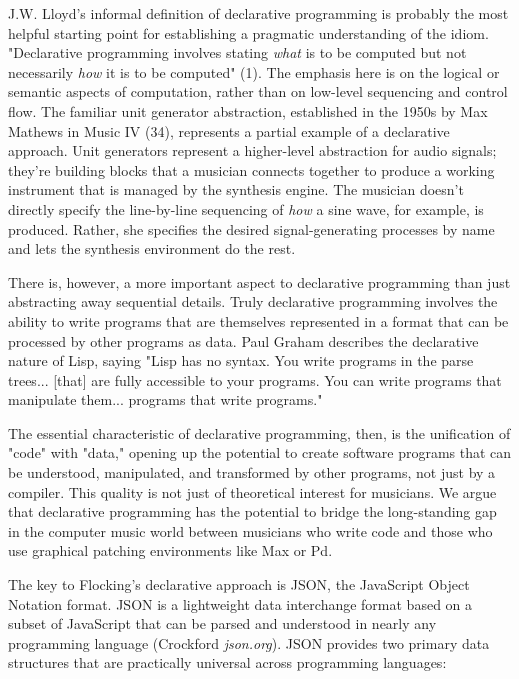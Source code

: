 \documentclass{article}
\begin{document}
J.W. Lloyd's informal definition of declarative programming is probably the most helpful starting point for establishing a pragmatic understanding of the idiom. "Declarative programming involves stating {\it what} is to be computed but not necessarily {\it how} it is to be computed" (1). The emphasis here is on the logical or semantic aspects of computation, rather than on low-level sequencing and control flow. The familiar unit generator abstraction, established in the 1950s by Max Mathews in Music IV (34), represents a partial example of a declarative approach. Unit generators represent a higher-level abstraction for audio signals; they're building blocks that a musician connects together to produce a working instrument that is managed by the synthesis engine. The musician doesn't directly specify the line-by-line sequencing of {\it how} a sine wave, for example, is produced. Rather, she specifies the desired signal-generating processes by name and lets the synthesis environment do the rest.

There is, however, a more important aspect to declarative programming than just abstracting away sequential details. Truly declarative programming involves the ability to write programs that are themselves represented in a format that can be processed by other programs as data. Paul Graham describes the declarative nature of Lisp, saying "Lisp has no syntax. You write programs in the parse trees... [that] are fully accessible to your programs. You can write programs that manipulate them... programs that write programs."

The essential characteristic of declarative programming, then, is the unification of "code" with "data," opening up the potential to create software programs that can be understood, manipulated, and transformed by other programs, not just by a compiler. This quality is not just of theoretical interest for musicians. We argue that declarative programming has the potential to bridge the long-standing gap in the computer music world between musicians who write code and those who use graphical patching environments like Max or Pd.

The key to Flocking's declarative approach is JSON, the JavaScript Object Notation format. JSON is a lightweight data interchange format based on a subset of JavaScript that can be parsed and understood in nearly any programming language (Crockford {\it json.org}). JSON provides two primary data structures that are practically universal across programming languages: 
\end{document}
